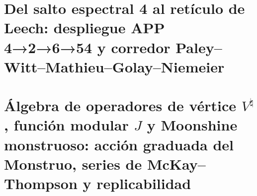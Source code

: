 

\chapter{Del salto espectral 4 al retículo de Leech: despliegue APP 4→2→6→54 y corredor Paley–Witt–Mathieu–Golay–Niemeier}
\label{chap:sucesor-102-21}

\begin{HMTScientificOwnerSubordinated}


\end{HMTScientificOwnerSubordinated}


















\chapter{Álgebra de operadores de vértice \texorpdfstring{\(V^\natural\)}{V^♮}, función modular \texorpdfstring{\(J\)}{J} y Moonshine monstruoso: acción graduada del Monstruo, series de McKay–Thompson y replicabilidad}
\label{chap:sucesor-102-22}
\label{chap:voa-moonshine-rector}






